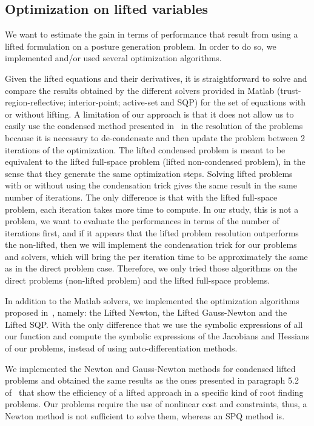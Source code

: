 \subsection{Optimization on lifted variables}
\label{subsec:optimization_on_lifted_variables}

We want to estimate the gain in terms of performance that result from using a lifted formulation on a posture generation problem.
In order to do so, we implemented and/or used several optimization algorithms.

Given the lifted equations and their derivatives, it is straightforward to solve and compare the results obtained by the different solvers provided in Matlab (trust-region-reflective; interior-point; active-set and SQP) for the set of equations with or without lifting.
A limitation of our approach is that it does not allow us to easily use the condensed method presented in~\cite{Albersmeyer:2010:LNM:1958447.1958472} in the resolution of the problems because it is necessary to de-condensate and then update the problem between 2 iterations of the optimization.
The lifted condensed problem is meant to be equivalent to the lifted full-space problem (lifted non-condensed problem), in the sense that they generate the same optimization steps.
Solving lifted problems with or without using the condensation trick gives the same result in the same number of iterations.
The only difference is that with the lifted full-space problem, each iteration takes more time to compute.
In our study, this is not a problem, we want to evaluate the performances in terms of the number of iterations first, and if it appears that the lifted problem resolution outperforms the non-lifted, then we will implement the condensation trick for our problems and solvers, which will bring the per iteration time to be approximately the same as in the direct problem case.
Therefore, we only tried those algorithms on the direct problems (non-lifted problem) and the lifted full-space problems.

In addition to the Matlab solvers, we implemented the optimization algorithms proposed in~\cite{Albersmeyer:2010:LNM:1958447.1958472}, namely: the Lifted Newton, the Lifted Gauss-Newton and the Lifted SQP.
With the only difference that we use the symbolic expressions of all our function and compute the symbolic expressions of the Jacobians and Hessians of our problems, instead of using auto-differentiation methods.

We implemented the Newton and Gauss-Newton methods for condensed lifted problems and obtained the same results as the ones presented in paragraph 5.2 of~\cite{Albersmeyer:2010:LNM:1958447.1958472} that show the efficiency of a lifted approach in a specific kind of root finding problems.
Our problems require the use of nonlinear cost and constraints, thus, a Newton method is not sufficient to solve them, whereas an SPQ method is.

